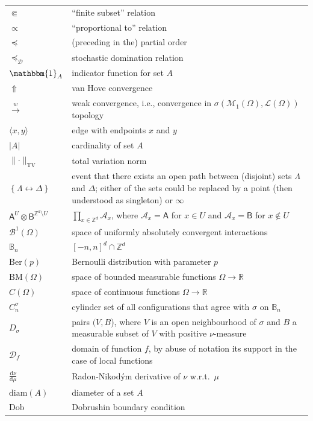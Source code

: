 \documentclass[12pt]{article}
\newcommand{\A}{\mathcal{A}}
\renewcommand{\AA}{\mathsf{A}}
\newcommand{\BB}{\mathscr{B}}
\newcommand{\BBB}{\mathbb{B}}
\newcommand{\AB}{\mathsf{B}}
\newcommand{\D}{\mathcal{D}}
\renewcommand{\d}{\mathrm{d}}
\newcommand{\Loc}{\mathcal{L}}
\newcommand{\M}{\mathcal{M}}
\newcommand{\R}{\mathbb{R}}
\newcommand{\Z}{\mathbb{Z}}
\newcommand{\BM}{\mathrm{BM}}
\newcommand{\TV}{\mathrm{TV}}
\newcommand{\set}[1]{\left\{#1\right\}}
\newcommand{\ra}{\rightarrow}
\newcommand{\pika}{\boldsymbol{\cdot}}
\newcommand{\1}{\mathbbm{1}}
\renewcommand{\sp}[1]{\langle #1\rangle}
\newcommand{\5}{\vspace{0.5cm}}
\theoremstyle{definition}
\begin{document}
\begin{tabular}{p{4cm}p{10cm}}
$\Subset$ & ``finite subset'' relation \\
$\propto$ & ``proportional to'' relation \\
$\preceq$ & (preceding in the) partial order \\
$\preceq_\D$ & stochastic domination relation \\
$\1_A$ & indicator function for set $A$ \\
$\Uparrow$ & van Hove convergence \\
$\xrightarrow{w}$ & weak convergence, i.e., convergence in $\sigma(\M_1(\Omega),\Loc(\Omega))$ topology \\
$\sp{x,y}$ & edge with endpoints $x$ and $y$ \\
$|A|$ & cardinality of set $A$ \\
$\|\!\pika\!\|_\TV$ & total variation norm \\
$\set{\Lambda\leftrightarrow\Delta}$ & event that there exists an open path between (disjoint) sets $\Lambda$ and $\Delta$; either of the sets could be replaced by a point (then understood as singleton) or $\infty$ \\
$\AA^U\otimes\AB^{\Z^d\setminus U}$ & $\prod_{x\in\Z^d}\A_x$, where $\A_x=\AA$ for $x\in U$ and $\A_x=\AB$ for $x\notin U$ \\
$\BB^1(\Omega)$ & space of uniformly absolutely convergent interactions \\
$\BBB_n$ & $[-n,n]^d\cap\Z^d$ \\
$\mathrm{Ber}(p)$ & Bernoulli distribution with parameter $p$ \\
$\BM(\Omega)$ & space of bounded measurable functions $\Omega\ra\R$ \\
$C(\Omega)$ & space of continuous functions $\Omega\ra\R$ \\
$C_n^\sigma$ & cylinder set of all configurations that agree with $\sigma$ on $\BBB_n$ \\
$D_\sigma$ & pairs $(V,B$), where $V$ is an open neighbourhood of $\sigma$ and $B$ a measurable subset of $V$ with positive $\nu$-measure \\
$\D_f$ & domain of function $f$, by abuse of notation its support in the case of local functions \\
$\frac{\d\nu}{\d\mu}$ & Radon-Nikod\'ym derivative of $\nu$ w.r.t.~$\mu$ \\
$\mathrm{diam}(A)$ & diameter of a set $A$ \\
$\mathrm{Dob}$ & Dobrushin boundary condition \\

\end{tabular}
\end{document}

